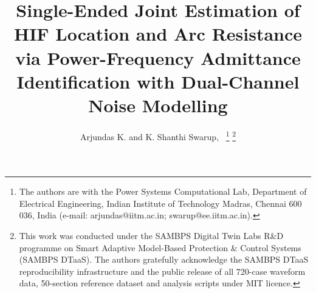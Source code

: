 \documentclass[journal]{IEEEtran}
\begin{document}

\title{Single-Ended Joint Estimation of HIF Location and Arc Resistance
       via Power-Frequency Admittance Identification with
       Dual-Channel Noise Modelling}

\author{%
  Arjundas K. and K. Shanthi Swarup,~%
  \thanks{The authors are with the Power Systems Computational Lab,
          Department of Electrical Engineering,
          Indian Institute of Technology Madras, Chennai 600\,036, India
          (e-mail: arjundas@iitm.ac.in; swarup@ee.iitm.ac.in).}%
  \thanks{This work was conducted under the SAMBPS Digital Twin Labs
          R\&D programme on Smart Adaptive Model-Based Protection \&
          Control Systems (SAMBPS DTaaS).  The authors gratefully
          acknowledge the SAMBPS DTaaS reproducibility infrastructure
          and the public release of all 720-case waveform data,
          50-section reference dataset and analysis scripts under MIT
          licence.}%
}


\maketitle
\end{document}
